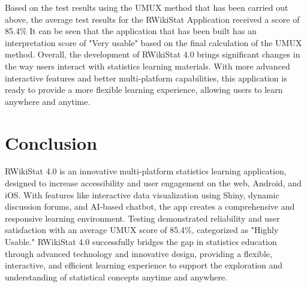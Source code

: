 \documentclass[conference,a4paper]{IEEEtran}
\begin{document}
Based on the test results using the UMUX method that has been carried out
above, the average test results for the RWikiStat Application received a score
of 85.4\% It can be seen that the application that has been built has an
interpretation score of "Very usable" based on the final calculation of the
UMUX method. Overall, the development of RWikiStat 4.0 brings significant
changes in the way users interact with statistics learning materials. With more
advanced interactive features and better multi-platform capabilities, this
application is ready to provide a more flexible learning experience, allowing
users to learn anywhere and anytime.

\section{Conclusion}
\label{sect:conclusion}

RWikiStat 4.0 is an innovative multi-platform statistics learning application,
designed to increase accessibility and user engagement on the web, Android, and
iOS. With features like interactive data visualization using Shiny, dynamic
discussion forums, and AI-based chatbot, the app creates a comprehensive and
responsive learning environment. Testing demonstrated reliability and user
satisfaction with an average UMUX score of 85.4\%, categorized as "Highly
Usable." RWikiStat 4.0 successfully bridges the gap in statistics education
through advanced technology and innovative design, providing a flexible,
interactive, and efficient learning experience to support the exploration and
understanding of statistical concepts anytime and anywhere.

\balance
\end{document}
